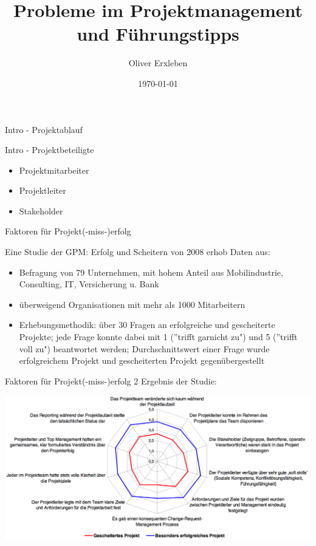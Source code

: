 \documentclass[10pt]{beamer}
\title{Probleme im Projektmanagement und Führungstipps}
\author{Oliver Erxleben}
\institute{Hochschule Osnabrück}
\date{\today}
\begin{document}
	\thispagestyle{empty}
	\frame{\titlepage}
		
	\begin{frame}{Intro - Projektablauf}
		
	\end{frame}

	\begin{frame}{Intro - Projektbeteiligte}
	
		\begin{itemize}
			\item{Projektmitarbeiter}
			\item{Projektleiter}
			\item{Stakeholder}
		\end{itemize}

	
	\end{frame}
	
	\thispagestyle{empty}
	
	\begin{frame}{Faktoren für Projekt(-miss-)erfolg}
		
		Eine Studie der GPM: Erfolg und Scheitern von 2008 erhob Daten aus: 
		\begin{itemize}
			\item{Befragung von 79 Unternehmen, mit hohem Anteil aus Mobilindustrie, Consulting, IT, Versicherung u. Bank }
			\item{überweigend Organisationen mit mehr als 1000 Mitarbeitern}
			\item{Erhebungsmethodik: über 30 Fragen an erfolgreiche und gescheiterte Projekte; jede Frage konnte dabei mit 1 (''trifft garnicht zu") und 5 (''trifft voll zu") beantwortet werden; Durchschnittswert einer Frage wurde erfolgreichem Projekt und gescheiterten Projekt gegenübergestellt}
		\end{itemize}

	\end{frame}

	\begin{frame}{Faktoren für Projekt(-miss-)erfolg 2}
	Ergebnis der Studie:
		\begin{center}
			\includegraphics[width=1\textwidth]{images/studie_erfolgsfaktoren}
		\end{center}

	\end{frame}
\end{document}
